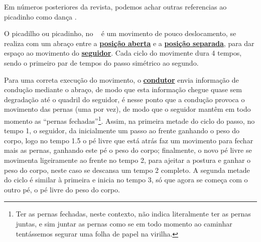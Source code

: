 Em números posteriores da revista, 
podemos achar outras referencias ao picadinho como dança \cite[pp. 52]{picadinho2} \cite[pp. 49]{picadinho3}.


O picadilho ou picadinho, no \AnoLivro~ é um movimento de pouco deslocamento, 
se realiza com um abraço entre a \hyperref[def:open-position]{\textbf{posição aberta}} e a 
\hyperref[def:apart-position]{\textbf{posição separada}}, 
para dar espaço ao movimento do \hyperref[def:Seguidor]{\textbf{seguidor}}.
Cada ciclo do movimente dura 4 tempos, sendo o primeiro par de tempos do passo simétrico ao segundo.

Para uma correta execução do movimento, 
o \hyperref[def:Condutor]{\textbf{condutor}} envia informação de condução mediante o abraço,
de modo que esta informação chegue quase sem degradação até o quadril do seguidor,
é nesse ponto que a condução provoca o movimento das pernas (uma por vez), de modo que
o seguidor mantêm em todo momento as ``pernas fechadas''\footnote{
Ter as pernas fechadas, neste contexto, não indica literalmente ter as pernas juntas, 
e sim juntar as pernas como se em todo momento ao caminhar tentássemos segurar uma folha de papel na virilha.}.
Assim, na primeira metade do ciclo do passo, no tempo 1, o seguidor,
da inicialmente um passo ao frente ganhando o peso do corpo, 
logo no tempo 1.5 o pé livre que está atrás faz um movimento para fechar mais as pernas, 
ganhando este pé o peso do corpo; finalmente, o novo pé livre se movimenta ligeiramente ao frente no tempo 2, 
para ajeitar a postura e ganhar o peso do corpo, neste caso se descansa um tempo 2 completo.
A segunda metade do ciclo é similar à primeira e inicia no tempo 3, só que agora se começa com o outro pé, 
o pé livre do peso do corpo.\\


